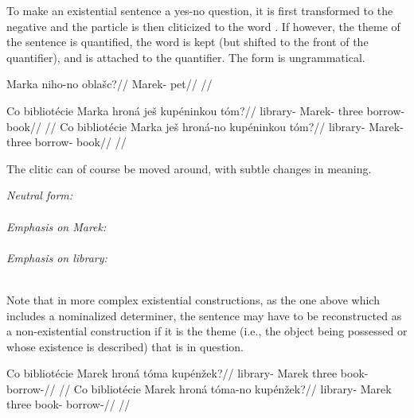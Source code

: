 To make an existential sentence a yes-no question, it is first transformed to the negative and the particle  is then cliticized to the word . If however, the theme of the sentence is quantified, the word  is kept (but shifted to the front of the quantifier), and  is attached to the quantifier. The form  is ungrammatical.

\pex
\begingl
\gla Marka niho-no obla\v{s}c?//
\glb Marek-  pet//
\glft {}//
\endgl
\xe

\pex
\a
\begingl
\gla Co bibliot\'ecie Marka hron\'a je\v{s} kup\'eninkou t\'om?//
\glb {} library- Marek- three  borrow- book//
\glft {}//
\endgl
\a
\begingl
\gla Co bibliot\'ecie Marka je\v{s} hron\'a-no kup\'eninkou t\'om?//
\glb {} library- Marek-  three borrow- book//
\glft {}//
\endgl
\xe

The clitic  can of course be moved around, with subtle changes in meaning.

\pex
\a \emph{Neutral form:}\\
\\
\a \emph{Emphasis on \emph{Marek:}}\\
\\
\a \emph{Emphasis on \emph{library:}}\\
\\
\xe

Note that in more complex existential constructions, as the one above which includes a nominalized determiner, the sentence may have to be reconstructed as a non-existential construction if it is the theme (i.e., the object being possessed or whose existence is described) that is in question.

\pex
\a
\begingl
\gla Co bibliot\'ecie Marek hron\'a t\'oma kup\'en\v{z}ek?//
\glb {} library- Marek three book- borrow-//
\glft {}//
\endgl
\a
\begingl
\gla Co bibliot\'ecie Marek hron\'a t\'oma-no kup\'en\v{z}ek?//
\glb {} library- Marek three book- borrow-//
\glft {}//
\endgl
\xe

